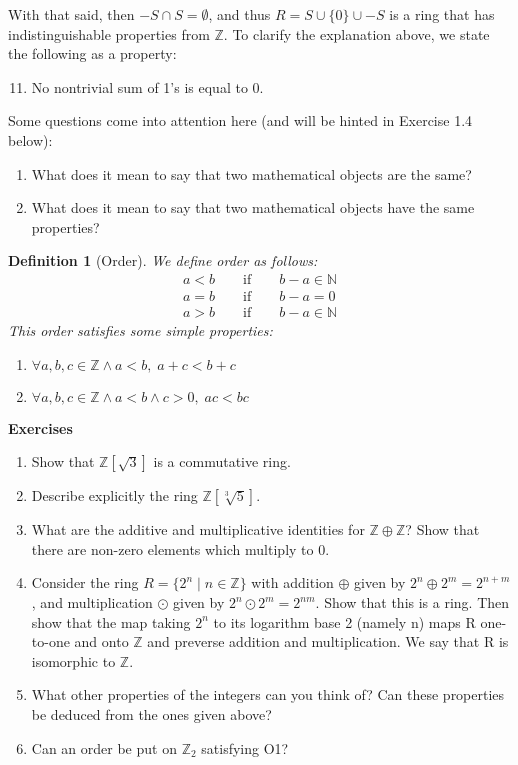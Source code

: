 \documentclass[11pt, oneside]{book}
\theoremstyle{break}
\newtheorem{defn}{Definition}[section]
\newcommand{\bb}[1]{\mathbb{#1}}			%
\begin{document}
With that said, then $-S \cap S = \emptyset$, and thus $R = S \cup \{0\} \cup -S$ is a ring that has indistinguishable properties from $\bb{Z}$. To clarify the explanation above, we state the following as a property:

\begin{enumerate}
	\setcounter{enumi}{10}
	\item No nontrivial sum of 1's is equal to 0.
\end{enumerate}

Some questions come into attention here (and will be hinted in Exercise 1.4 below):
\begin{enumerate}
	\item What does it mean to say that two mathematical objects are the same?
	\item What does it mean to say that two mathematical objects have the same properties?
\end{enumerate}

\begin{defn}[Order]
	We define order as follows:
	\begin{gather*}
		a < b \qquad \text{if} \qquad b - a \in \bb{N} \\
		a = b \qquad \text{if} \qquad b - a = 0 \\
		a > b \qquad \text{if} \qquad b - a \in \bb{N}
	\end{gather*}
	This order satisfies some simple properties:
	\begin{enumerate}
		\item[O1] $\forall a, b, c \in \bb{Z} \land a < b, \; a + c < b + c$
		\item[O2] $\forall a, b, c \in \bb{Z} \land a < b \land c > 0, \; ac < bc$
	\end{enumerate}
\end{defn}

\textbf{Exercises}
\begin{enumerate}
	\item[1.1] Show that $\bb{Z}[\sqrt{3}]$ is a commutative ring.
	\item[1.2] Describe explicitly the ring $\bb{Z}[\sqrt[3]{5}]$.
	\item[1.3] What are the additive and multiplicative identities for $\bb{Z} \oplus \bb{Z}$? Show that there are non-zero elements which multiply to 0.
	\item[1.4] Consider the ring $R = \{2^n \; | \; n \in \bb{Z}\}$ with addition $\oplus$ given by $2^n \oplus 2^m = 2^{n + m}$, and multiplication $\odot$ given by $2^n \odot 2^m = 2^{nm}$. Show that this is a ring. Then show that the map taking $2^n$ to its logarithm base 2 (namely n) maps R one-to-one and onto $\bb{Z}$ and preverse addition and multiplication. We say that R is isomorphic to $\bb{Z}$.
	\item[1.5] What other properties of the integers can you think of? Can these properties be deduced from the ones given above?
	\item[1.6] Can an order be put on $\bb{Z}_2$ satisfying O1?
\end{enumerate}
\end{document}
